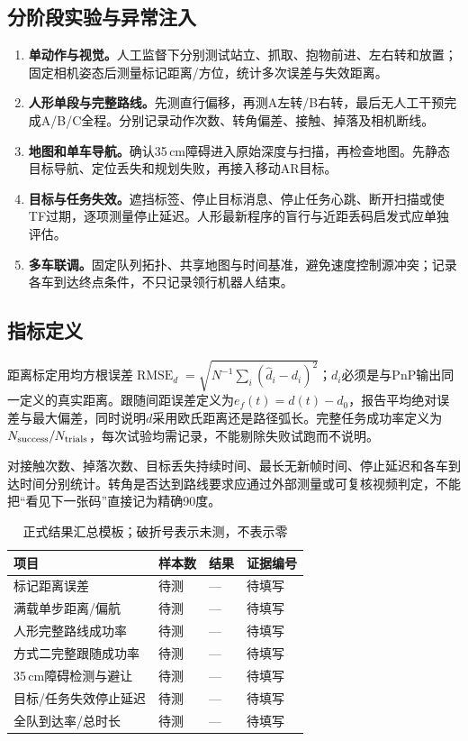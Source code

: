 \subsection{分阶段实验与异常注入}
\begin{enumerate}
\item \textbf{单动作与视觉。}人工监督下分别测试站立、抓取、抱物前进、左右转和放置；固定相机姿态后测量标记距离/方位，统计多次误差与失效距离。
\item \textbf{人形单段与完整路线。}先测直行偏移，再测A左转/B右转，最后无人工干预完成A/B/C全程。分别记录动作次数、转角偏差、接触、掉落及相机断线。
\item \textbf{地图和单车导航。}确认35\,cm障碍进入原始深度与扫描，再检查地图。先静态目标导航、定位丢失和规划失败，再接入移动AR目标。
\item \textbf{目标与任务失效。}遮挡标签、停止目标消息、停止任务心跳、断开扫描或使TF过期，逐项测量停止延迟。人形最新程序的盲行与近距丢码启发式应单独评估。
\item \textbf{多车联调。}固定队列拓扑、共享地图与时间基准，避免速度控制源冲突；记录各车到达终点条件，不只记录领行机器人结束。
\end{enumerate}

\subsection{指标定义}
距离标定用均方根误差$\operatorname{RMSE}_d=\sqrt{N^{-1}\sum_i(\hat d_i-d_i)^2}$；$d_i$必须是与PnP输出同一定义的真实距离。跟随间距误差定义为$e_f(t)=d(t)-d_0$，报告平均绝对误差与最大偏差，同时说明$d$采用欧氏距离还是路径弧长。完整任务成功率定义为$N_{\rm success}/N_{\rm trials}$，每次试验均需记录，不能剔除失败试跑而不说明。

对接触次数、掉落次数、目标丢失持续时间、最长无新帧时间、停止延迟和各车到达时间分别统计。转角是否达到路线要求应通过外部测量或可复核视频判定，不能把“看见下一张码”直接记为精确90度。

\begin{table}[H]\centering\small
\caption{正式结果汇总模板；破折号表示未测，不表示零}
\begin{tabularx}{\linewidth}{Yp{26mm}p{26mm}p{25mm}}\toprule
项目 & 样本数 & 结果 & 证据编号\\\midrule
标记距离误差 & 待测 & --- & 待填写\\
满载单步距离/偏航 & 待测 & --- & 待填写\\
人形完整路线成功率 & 待测 & --- & 待填写\\
方式二完整跟随成功率 & 待测 & --- & 待填写\\
35\,cm障碍检测与避让 & 待测 & --- & 待填写\\
目标/任务失效停止延迟 & 待测 & --- & 待填写\\
全队到达率/总时长 & 待测 & --- & 待填写\\\bottomrule
\end{tabularx}\end{table}

